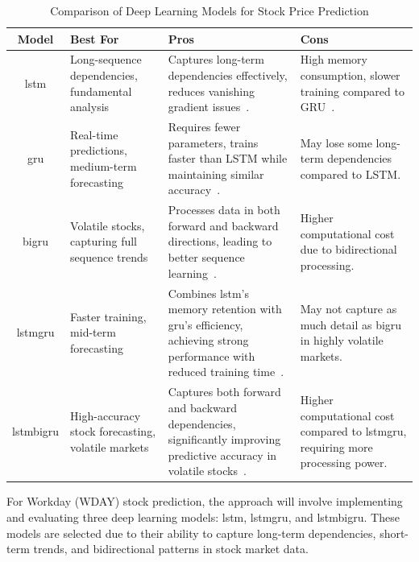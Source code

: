 \begin{table}[H]
    \centering
    \caption{Comparison of Deep Learning Models for Stock Price Prediction}
    \label{tab:stock_models}
    \begin{tabular}{cp{4cm}p{4cm}p{4cm}}
        \hline
        \textbf{Model} & \textbf{Best For} & \textbf{Pros} & \textbf{Cons} \\
        \hline
        \acrshort{lstm} & Long-sequence dependencies, fundamental analysis & Captures
        long-term dependencies effectively, reduces vanishing gradient
        issues~\parencite{shaban2024SMPDL}. & High memory consumption, slower training 
        compared to GRU~\parencite{chang2024StockPrediction}. \\
        \acrshort{gru} & Real-time predictions, medium-term forecasting & Requires 
        fewer parameters, trains faster than LSTM while maintaining similar
        accuracy~\parencite{guo2024LSTMStock}. & May lose some long-term dependencies 
        compared to LSTM. \\
        \acrshort{bigru} & Volatile stocks, capturing full sequence trends & Processes 
        data in both forward and backward directions, leading to better sequence
        learning~\parencite{shaban2024SMPDL}. & Higher computational cost due to 
        bidirectional processing. \\
        \acrshort{lstmgru} & Faster training, mid-term forecasting & 
        Combines \acrshort{lstm}'s memory retention with \acrshort{gru}’s efficiency,
        achieving strong performance with reduced training 
        time~\parencite{chang2024StockPrediction}. & May not capture as much detail as 
        \acrshort{bigru} in highly volatile markets. \\
        \acrshort{lstmbigru} & High-accuracy stock forecasting, volatile markets & 
        Captures both forward and backward dependencies, significantly improving 
        predictive accuracy in volatile stocks~\parencite{shaban2024SMPDL}. & 
        Higher computational cost compared to \acrshort{lstmgru}, requiring more 
        processing power. \\ \hline
    \end{tabular}
\end{table}

For Workday (WDAY) stock prediction, the approach will involve implementing and evaluating 
three deep learning models: \acrshort{lstm}, \acrshort{lstmgru}, and \acrshort{lstmbigru}.
These models are selected due to their ability to capture long-term dependencies, 
short-term trends, and bidirectional patterns in stock market data.

